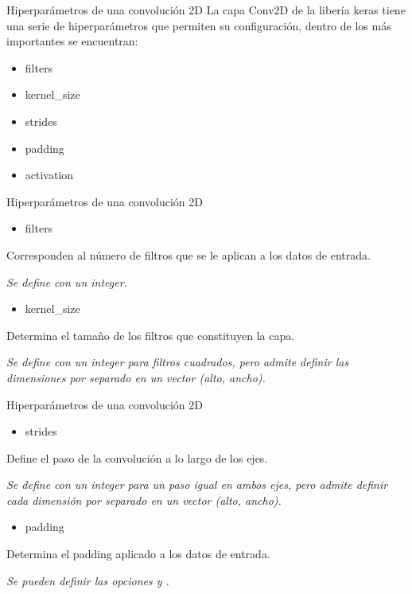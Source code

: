 \begin{frame}{Hiperparámetros de una convolución 2D}
La capa \alert{Conv2D} de la libería \alert{keras} tiene una serie de \alert{hiperparámetros} que permiten su \alert{configuración}, dentro de los más importantes se encuentran:
\begin{itemize}
    \item \alert{filters}
    \item \alert{kernel\_size}
    \item \alert{strides}
    \item \alert{padding}
    \item \alert{activation}
\end{itemize}
\end{frame}

\begin{frame}{Hiperparámetros de una convolución 2D}
\begin{itemize}
    \item \alert{\Large filters}
\end{itemize}

Corresponden al \alert{número de filtros} que se le aplican a los datos de entrada.

\textit{Se define con un \alert{integer}.}

\begin{itemize}
    \item \alert{\Large kernel\_size}
\end{itemize}

Determina el \alert{tamaño de los filtros} que constituyen la capa.

\textit{Se define con un \alert{integer} para filtros \alert{cuadrados}, pero admite definir las dimensiones por separado en un vector \alert{(alto, ancho)}.}
\end{frame}

\begin{frame}{Hiperparámetros de una convolución 2D}
\begin{itemize}
    \item \alert{\Large strides}
\end{itemize}

Define el \alert{paso} de la convolución a lo largo de los ejes.

\textit{Se define con un \alert{integer} para un paso igual en \alert{ambos ejes}, pero admite definir cada dimensión por separado en un vector \alert{(alto, ancho)}.}

\begin{itemize}
    \item \alert{\Large padding}
\end{itemize}

Determina el \alert{padding} aplicado a los datos de entrada.

\textit{Se pueden definir las opciones  y .}
\end{frame}

